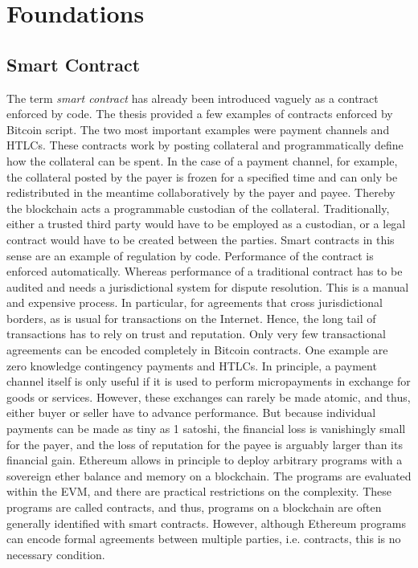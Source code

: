 

\section{Foundations}


\subsection{Smart Contract}

The term \emph{smart contract} has already been introduced vaguely as a contract enforced by code. The thesis provided a few examples of contracts enforced by Bitcoin script. The two most important examples were payment channels and \ac{HTLC}s. These contracts work by posting collateral and programmatically define how the collateral can be spent. In the case of a payment channel, for example, the collateral posted by the payer is frozen for a specified time and can only be redistributed in the meantime collaboratively by the payer and payee. Thereby the blockchain acts a programmable custodian of the collateral. Traditionally, either a trusted third party would have to be employed as a custodian, or a legal contract would have to be created between the parties. Smart contracts in this sense are an example of regulation by code. Performance of the contract is enforced automatically. Whereas performance of a traditional contract has to be audited and needs a jurisdictional system for dispute resolution. This is a manual and expensive process. In particular, for agreements that cross jurisdictional borders, as is usual for transactions on the Internet. Hence, the long tail of transactions has to rely on trust and reputation. 
Only very few transactional agreements can be encoded completely in Bitcoin contracts. One example are zero knowledge contingency payments and \ac{HTLC}s. In principle, a payment channel itself is only useful if it is used to perform micropayments in exchange for goods or services. However, these exchanges can rarely be made atomic, and thus, either buyer or seller have to advance performance. But because individual payments can be made as tiny as 1 satoshi, the financial loss is vanishingly small for the payer, and the loss of reputation for the payee is arguably larger than its financial gain. 
Ethereum allows in principle to deploy arbitrary programs with a sovereign ether balance and memory on a blockchain. The programs are evaluated within the \ac{EVM}, and there are practical restrictions on the complexity. These programs are called contracts, and thus, programs on a blockchain are often generally identified with smart contracts. However, although Ethereum programs can encode formal agreements between multiple parties, i.e. contracts, this is no necessary condition.
